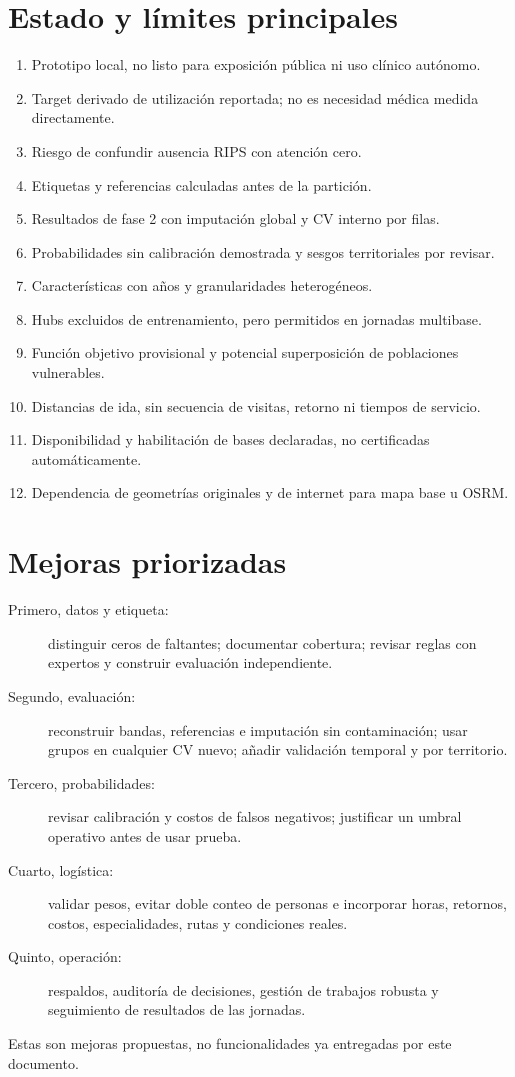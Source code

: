 \documentclass[11pt,a4paper]{report}
\begin{document}
\section{Estado y límites principales}
\begin{enumerate}
\item Prototipo local, no listo para exposición pública ni uso clínico autónomo.
\item Target derivado de utilización reportada; no es necesidad médica medida directamente.
\item Riesgo de confundir ausencia RIPS con atención cero.
\item Etiquetas y referencias calculadas antes de la partición.
\item Resultados de fase 2 con imputación global y CV interno por filas.
\item Probabilidades sin calibración demostrada y sesgos territoriales por revisar.
\item Características con años y granularidades heterogéneos.
\item Hubs excluidos de entrenamiento, pero permitidos en jornadas multibase.
\item Función objetivo provisional y potencial superposición de poblaciones vulnerables.
\item Distancias de ida, sin secuencia de visitas, retorno ni tiempos de servicio.
\item Disponibilidad y habilitación de bases declaradas, no certificadas automáticamente.
\item Dependencia de geometrías originales y de internet para mapa base u OSRM.
\end{enumerate}

\section{Mejoras priorizadas}
\begin{description}
\item[Primero, datos y etiqueta:] distinguir ceros de faltantes; documentar cobertura; revisar reglas con expertos y construir evaluación independiente.
\item[Segundo, evaluación:] reconstruir bandas, referencias e imputación sin contaminación; usar grupos en cualquier CV nuevo; añadir validación temporal y por territorio.
\item[Tercero, probabilidades:] revisar calibración y costos de falsos negativos; justificar un umbral operativo antes de usar prueba.
\item[Cuarto, logística:] validar pesos, evitar doble conteo de personas e incorporar horas, retornos, costos, especialidades, rutas y condiciones reales.
\item[Quinto, operación:] respaldos, auditoría de decisiones, gestión de trabajos robusta y seguimiento de resultados de las jornadas.
\end{description}
Estas son mejoras propuestas, no funcionalidades ya entregadas por este documento.
\end{document}
